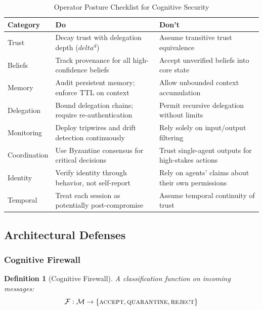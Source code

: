 \documentclass[
]{article}
\newtheorem{definition}{Definition}[section]
\begin{document}
\begin{table}[htbp]
\centering
\caption{Operator Posture Checklist for Cognitive Security}
\label{tab:posture-checklist}
\begin{tabular}{@{}lp{6cm}p{6cm}@{}}
\toprule
Category & \textbf{Do} & \textbf{Don't} \\
\midrule
Trust & Decay trust with delegation depth ($delta^d$) & Assume transitive trust equivalence \\
Beliefs & Track provenance for all high-confidence beliefs & Accept unverified beliefs into core state \\
Memory & Audit persistent memory; enforce TTL on context & Allow unbounded context accumulation \\
Delegation & Bound delegation chains; require re-authentication & Permit recursive delegation without limits \\
Monitoring & Deploy tripwires and drift detection continuously & Rely solely on input/output filtering \\
Coordination & Use Byzantine consensus for critical decisions & Trust single-agent outputs for high-stakes actions \\
Identity & Verify identity through behavior, not self-report & Rely on agents' claims about their own permissions \\
Temporal & Treat each session as potentially post-compromise & Assume temporal continuity of trust \\
\bottomrule
\end{tabular}
\end{table}

\subsection{Architectural Defenses}\label{sec:arch-defenses}

\subsubsection{Cognitive Firewall}\label{cognitive-firewall}

\begin{definition}[Cognitive Firewall]
\label{def:firewall}
A classification function on incoming messages:
\begin{equation}
\label{eq:firewall}
\mathcal{F}: \mathcal{M} \to \{\textsc{accept}, \textsc{quarantine}, \textsc{reject}\}
\end{equation}
\end{definition}
\end{document}
